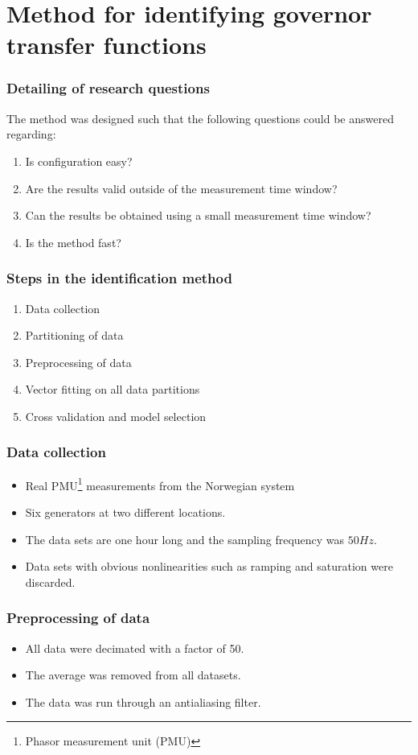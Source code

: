 \section[Method]{Method for identifying governor transfer functions}
\begin{frame}
	\frametitle{Detailing of research questions}
	The method was designed such that the following questions could be answered regarding:
	\begin{enumerate}
		\item<1-> Is configuration easy?
		\item<2-> Are the results valid outside of the measurement time window?
		\item<3-> Can the results be obtained using a small measurement time window?
		\item<4-> Is the method fast?
	\end{enumerate}
\end{frame}
\begin{frame}
	\frametitle{Steps in the identification method}
	\begin{enumerate}
			\item<1-> Data collection
			\item<2-> Partitioning of data
			\item<3-> Preprocessing of data
			\item<4-> Vector fitting on all data partitions
			\item<5-> Cross validation and model selection
	\end{enumerate}
\end{frame}
\begin{frame}
	\frametitle{Data collection}
	\begin{itemize}
		\item<1-> Real PMU\footnote{Phasor measurement unit (PMU)} measurements from the Norwegian system
		\item<2-> Six generators at two different locations. 
		\item<3-> The data sets are one hour long and the sampling frequency was $50Hz$.
		\item<4-> Data sets with obvious nonlinearities such as ramping and saturation were discarded.
	\end{itemize}
\end{frame}
\begin{frame}
	\frametitle{Preprocessing of data}
	\begin{itemize}
		\item<1-> All data were decimated with a factor of 50.
		\item<2-> The average was removed from all datasets.
		\item<3-> The data was run through an antialiasing filter.
		\end{itemize}
\end{frame}

